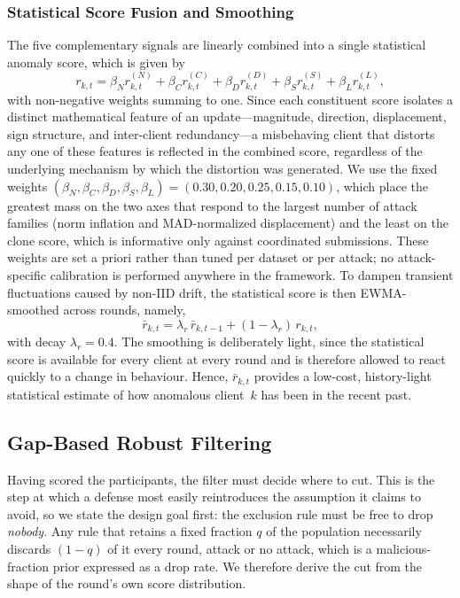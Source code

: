 \documentclass[journal]{IEEEtran}
\begin{document}
\subsubsection{Statistical Score Fusion and Smoothing}
The five complementary signals are linearly combined into a single statistical anomaly score, which is given by
\begin{equation}
r_{k,t} = \beta_N r_{k,t}^{(N)} + \beta_C r_{k,t}^{(C)} + \beta_D r_{k,t}^{(D)} + \beta_S r_{k,t}^{(S)} + \beta_L r_{k,t}^{(L)},
\label{eq:stat_score}
\end{equation}
with non-negative weights summing to one. Since each constituent score isolates a distinct mathematical feature of an update---magnitude, direction, displacement, sign structure, and inter-client redundancy---a misbehaving client that distorts any one of these features is reflected in the combined score, regardless of the underlying mechanism by which the distortion was generated. We use the fixed weights $(\beta_N, \beta_C, \beta_D, \beta_S, \beta_L) = (0.30, 0.20, 0.25, 0.15, 0.10)$, which place the greatest mass on the two axes that respond to the largest number of attack families (norm inflation and MAD-normalized displacement) and the least on the clone score, which is informative only against coordinated submissions. These weights are set a priori rather than tuned per dataset or per attack; no attack-specific calibration is performed anywhere in the framework. To dampen transient fluctuations caused by non-IID drift, the statistical score is then EWMA-smoothed across rounds, namely,
\begin{equation}
\bar r_{k,t} = \lambda_r\,\bar r_{k,t-1} + (1-\lambda_r)\,r_{k,t},
\label{eq:stat_ewma}
\end{equation}
with decay $\lambda_r = 0.4$. The smoothing is deliberately light, since the statistical score is available for every client at every round and is therefore allowed to react quickly to a change in behaviour. Hence, $\bar r_{k,t}$ provides a low-cost, history-light statistical estimate of how anomalous client~$k$ has been in the recent past.

\subsection{Gap-Based Robust Filtering}
\label{sec:dual_threshold}

Having scored the participants, the filter must decide where to cut. This is the step at which a defense most easily reintroduces the assumption it claims to avoid, so we state the design goal first: the exclusion rule must be free to drop \emph{nobody}. Any rule that retains a fixed fraction $q$ of the population necessarily discards $(1-q)$ of it every round, attack or no attack, which is a malicious-fraction prior expressed as a drop rate. We therefore derive the cut from the shape of the round's own score distribution.
\end{document}

